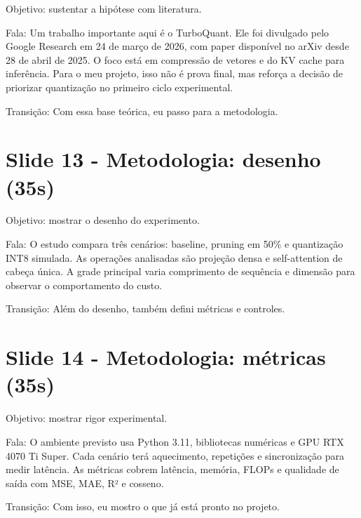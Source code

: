 Objetivo: sustentar a hipótese com literatura.







Fala: Um trabalho importante aqui é o TurboQuant. Ele foi divulgado pelo Google Research em 24 de março de 2026, com paper disponível no arXiv desde 28 de abril de 2025. O foco está em compressão de vetores e do KV cache para inferência. Para o meu projeto, isso não é prova final, mas reforça a decisão de priorizar quantização no primeiro ciclo experimental.




Transição: Com essa base teórica, eu passo para a metodologia.



\section{Slide 13 - Metodologia: desenho (35s)}


Objetivo: mostrar o desenho do experimento.






Fala: O estudo compara três cenários: baseline, pruning em 50\% e quantização INT8 simulada. As operações analisadas são projeção densa e self-attention de cabeça única. A grade principal varia comprimento de sequência e dimensão para observar o comportamento do custo.




Transição: Além do desenho, também defini métricas e controles.



\section{Slide 14 - Metodologia: métricas (35s)}


Objetivo: mostrar rigor experimental.






Fala: O ambiente previsto usa Python 3.11, bibliotecas numéricas e GPU RTX 4070 Ti Super. Cada cenário terá aquecimento, repetições e sincronização para medir latência. As métricas cobrem latência, memória, FLOPs e qualidade de saída com MSE, MAE, R² e cosseno.




Transição: Com isso, eu mostro o que já está pronto no projeto.



